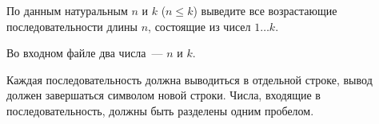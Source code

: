 По данным натуральным $n$ и $k$ ($n \le k$) выведите все возрастающие последовательности длины $n$, состоящие из чисел $1 \dots k$.

\InputFile

Во входном файле два числа~--- $n$ и $k$.

\OutputFile

Каждая последовательность должна выводиться в отдельной строке, вывод должен завершаться символом новой строки.
Числа, входящие в последовательность, должны быть разделены одним пробелом.

